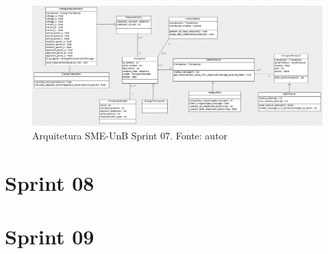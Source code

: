 \begin{figure}[!htpb]
    \centering
    \includegraphics[scale=0.4,angle=90]{figuras/sprint07arq.eps}
    \caption{Arquitetura SME-UnB Sprint 07. Fonte: autor}
    \label{sprint07arq}
\end{figure}

\section{Sprint 08}

\section{Sprint 09}
